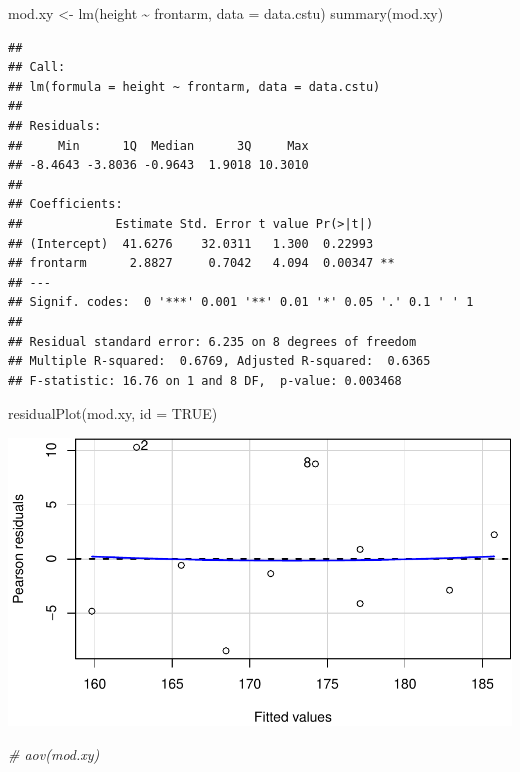 \documentclass{article}
\newenvironment{Shaded}{\begin{snugshade}}{\end{snugshade}}
\newcommand{\AttributeTok}[1]{\textcolor[rgb]{0.77,0.63,0.00}{#1}}
\newcommand{\CommentTok}[1]{\textcolor[rgb]{0.56,0.35,0.01}{\textit{#1}}}
\newcommand{\ConstantTok}[1]{\textcolor[rgb]{0.00,0.00,0.00}{#1}}
\newcommand{\FunctionTok}[1]{\textcolor[rgb]{0.00,0.00,0.00}{#1}}
\newcommand{\NormalTok}[1]{#1}
\newcommand{\OtherTok}[1]{\textcolor[rgb]{0.56,0.35,0.01}{#1}}
\newcommand{\SpecialCharTok}[1]{\textcolor[rgb]{0.00,0.00,0.00}{#1}}
\begin{document}
\begin{Shaded}
\begin{Highlighting}[]
\NormalTok{mod.xy }\OtherTok{\textless{}{-}} \FunctionTok{lm}\NormalTok{(height }\SpecialCharTok{\textasciitilde{}}\NormalTok{ frontarm, }\AttributeTok{data =}\NormalTok{ data.cstu)}
\FunctionTok{summary}\NormalTok{(mod.xy)}
\end{Highlighting}
\end{Shaded}

\begin{verbatim}
## 
## Call:
## lm(formula = height ~ frontarm, data = data.cstu)
## 
## Residuals:
##     Min      1Q  Median      3Q     Max 
## -8.4643 -3.8036 -0.9643  1.9018 10.3010 
## 
## Coefficients:
##             Estimate Std. Error t value Pr(>|t|)   
## (Intercept)  41.6276    32.0311   1.300  0.22993   
## frontarm      2.8827     0.7042   4.094  0.00347 **
## ---
## Signif. codes:  0 '***' 0.001 '**' 0.01 '*' 0.05 '.' 0.1 ' ' 1
## 
## Residual standard error: 6.235 on 8 degrees of freedom
## Multiple R-squared:  0.6769, Adjusted R-squared:  0.6365 
## F-statistic: 16.76 on 1 and 8 DF,  p-value: 0.003468
\end{verbatim}

\begin{Shaded}
\begin{Highlighting}[]
\FunctionTok{residualPlot}\NormalTok{(mod.xy, }\AttributeTok{id =} \ConstantTok{TRUE}\NormalTok{)}
\end{Highlighting}
\end{Shaded}

\includegraphics{Reference_solutions_files/figure-latex/unnamed-chunk-18-1.pdf}

\begin{Shaded}
\begin{Highlighting}[]
\CommentTok{\# aov(mod.xy)}
\end{Highlighting}
\end{Shaded}
\end{document}
